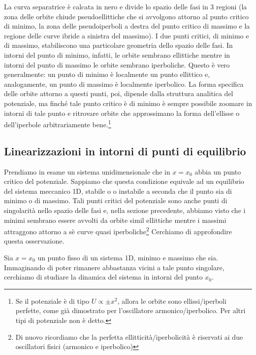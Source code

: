 \documentclass[a4paper,openany]{article}
\begin{document}
	La curva separatrice è calcata in nero e divide lo spazio delle fasi in 3 regioni (la zona delle orbite chiude pseudoellittiche che si avvolgono attorno al punto critico di minimo, la zona delle pseudoiperboli a destra del punto critico di massimo e la regione delle curve ibride a sinistra del massimo). I due punti critici, di minimo e di massimo, stabiliscono una particolare geometria dello spazio delle fasi. In intorni del punto di minimo, infatti, le orbite sembrano ellittiche mentre in intorni del punto di massimo le orbite sembrano iperboliche. Questo è vero generalmente: un punto di minimo è localmente un punto ellittico e, analogamente, un punto di massimo è localmente iperbolico.
	La forma specifica delle orbite attorno a questi punti, poi, dipende dalla struttura analitica del potenziale, ma finché tale punto critico è di minimo è sempre possibile zoomare in intorni di tale punto e ritrovare orbite che approssimano la forma dell'ellisse o dell'iperbole arbitrariamente bene.\footnote{Se il potenziale è di tipo $U\propto \pm x^{2}$, allora le orbite sono ellissi/iperboli perfette, come già dimostrato per l'oscillatore armonico/iperbolico. Per altri tipi di potenziale non è detto.}
	
	
	
	\subsection{Linearizzazioni in intorni di punti di equilibrio}
	Prendiamo in esame un sistema unidimensionale che in $x=x_0$ abbia un punto critico del potenziale. Sappiamo che questa condizione equivale ad un equilibrio del sistema meccanico 1D, stabile o o instabile a seconda che il punto sia di minimo o di massimo. Tali punti critici del potenziale sono anche punti di singolarità nello spazio delle fasi e, nella sezione precedente, abbiamo visto che i minimi sembrano essere avvolti da orbite simil ellittiche mentre i massimi attraggono attorno a sè curve quasi iperboliche\footnote{Di nuovo ricordiamo che la perfetta ellitticità/iperbolicità è riservati ai due oscillatori fisici (armonico e iperbolico)} Cerchiamo di approfondire questa osservazione.
	
	Sia $x=x_0$ un punto fisso di un sistema 1D, minimo e massimo che sia.  Immaginando di poter rimanere abbastanza vicini a tale punto singolare, cerchiamo di studiare la dinamica del sistema in intorni del punto $x_0$.
	
\end{document}
